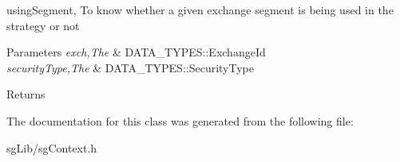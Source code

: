 using\-Segment, To know whether a given exchange segment is being used in the strategy or not 


\begin{DoxyParams}{Parameters}
{\em exch,The} & D\-A\-T\-A\-\_\-\-T\-Y\-P\-E\-S\-::\-Exchange\-Id \\
\hline
{\em security\-Type,The} & D\-A\-T\-A\-\_\-\-T\-Y\-P\-E\-S\-::\-Security\-Type \\
\hline
\end{DoxyParams}
\begin{DoxyReturn}{Returns}

\end{DoxyReturn}


The documentation for this class was generated from the following file\-:\begin{DoxyCompactItemize}
\item 
sg\-Lib/sg\-Context.\-h\end{DoxyCompactItemize}
